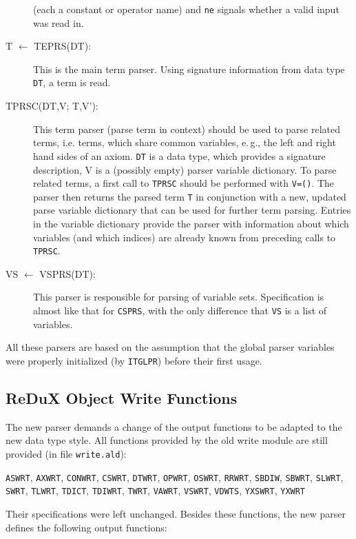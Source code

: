 \begin{description}
(each a constant or operator name) and {\tt ne} signals whether a valid input
was read in.
\item[T $\leftarrow$ TEPRS(DT):] This is the main term parser. Using
signature information from data type {\tt DT}, a term is read.
\item[TPRSC(DT,V; T,V'):] This term parser (parse term in context)
should be used to parse related terms, i.e. terms, which share
common variables, e.\,g., the left and right hand sides of an axiom.
{\tt DT} is a data type, which provides a signature description,
V is a (possibly empty) parser variable dictionary.
To parse related terms, a first call to {\tt TPRSC} should be
performed with {\tt V=()}. The parser then returns the parsed term
{\tt T} in conjunction with a new, updated parse variable dictionary
that can be used for further term parsing. Entries in the variable dictionary
provide the parser with information about which variables (and which indices)
are already known from preceding calls to {\tt TPRSC}.
\item[VS $\leftarrow$ VSPRS(DT):] This parser is responsible for
parsing of variable sets. Specification is almost like that for {\tt CSPRS},
with the only difference that {\tt VS} is a list of variables.
\end{description}

All these parsers are based on the assumption that the global
parser variables
were properly initialized (by {\tt ITGLPR}) before their first usage.

\subsection{ReDuX Object Write Functions}

The new parser demands a change of the output functions to be
adapted to the new data type style. All functions provided by
the old write module are still provided (in file {\tt write.ald}):

{\tt ASWRT}, {\tt AXWRT}, {\tt CONWRT}, {\tt CSWRT}, {\tt DTWRT},
{\tt OPWRT}, {\tt OSWRT}, {\tt RRWRT}, {\tt SBDIW}, {\tt SBWRT},
{\tt SLWRT}, {\tt SWRT}, {\tt TLWRT}, {\tt TDICT}, {\tt TDIWRT},
{\tt TWRT}, {\tt VAWRT}, {\tt VSWRT}, {\tt VDWTS}, {\tt YXSWRT},
{\tt YXWRT}

Their specifications were left unchanged.
Besides these functions, the new parser defines the following output
functions:

